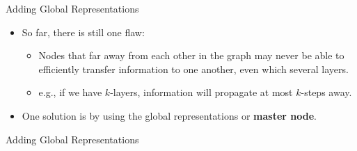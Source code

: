 \documentclass[
    11pt, %
    aspectratio=169, %
]{beamer}
\begin{document}
\begin{frame}{Adding Global Representations}
    \begin{itemize}
        \item So far, there is still one flaw:
        \begin{itemize}
            \itemsep.5em
            \item Nodes that far away from each other in the graph may never be able to efficiently transfer information to one another, even which several layers.
            \item e.g., if we have $k$-layers, information will propagate at most $k$-steps away.
        \end{itemize}

        \item One solution is by using the global representations or \textbf{master node}.
    \end{itemize}
\end{frame}

\begin{frame}{Adding Global Representations}

\end{frame}
\end{document}
